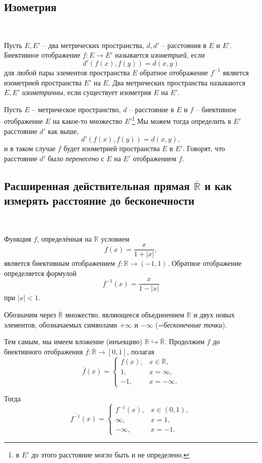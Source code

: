 \subsection{Изометрия}~

Пусть $E,E'$ -- два метрических пространства, $d,d'$ -- расстояния в $E$ и $E'$. Биективное отображение $f:E \to E'$ называется \textit{изометрией}, если
\[
 d'(f(x), f(y)) = d(x,y)
\]
для любой пары элементов пространства $E$ обратное отображение $f^{-1}$ является изометрией пространства $E'$ на $E$. Два метрических пространства называются $E,E'$ \textit{изометричны}, если существует изометрия $E$ на $E'$.


Пусть $E$ -- метрическое пространство, $d$ -- расстояние в $E$ и $f$ -- биективное отображение $E$ на какое-то множество $E'$\footnote{в $E'$ до этого расстояние могло быть и не определено.} Мы можем тогда определить в $E'$ расстояние $d'$ как выше, \ie
\[
 d'(f(x), f(y)) = d(x,y),
\]
и в таком случае $f$ будет изометрией пространства $E$ в $E'$. Говорят, что расстояние $d'$ было \textit{перенесено} с $E$ на $E'$ отображением $f.$

\subsection{Расширенная действительная прямая $\overline{\mathbb{R}}$ и как измерять расстояние до бесконечности}~

Функция $f$, определённая на $\mathbb{R}$ условием 
\[
f(x) = \frac{x}{1+ |x|},
\]
является биективным отображением $f:\mathbb{R} \to (-1,1)$. Обратное отображение определяется формулой 
\[
 f^{-1}(x) = \frac{x}{1- |x|}
\]
при $|x|<1.$

Обозначим через $\overline{\mathbb{R}}$ множество, являющееся объединением $\mathbb{R}$ и двух новых элементов, обозначаемых символами $+\infty$ и $- \infty$ (=\textit{бесконечные точки}).

Тем самым, мы имеем вложение (инъекцию) $\mathbb{R} \hookrightarrow \overline{\mathbb{R}}$. Продолжим $f$ до биективного отображения $\overline{f}: \overline{\mathbb{R}} \to [0,1]$, полагая
\[
\overline{f}(x) = \begin{cases}
    f(x), & x \in \mathbb{R},\\
    1, & x = \infty,\\
    -1, & x = - \infty.
\end{cases}
\]

Тогда
\[
\overline{f^{-1}}(x) = \begin{cases}
    f^{-1}(x), & x \in (0,1),\\
    \infty, & x = 1,\\
    -\infty, & x = - 1.
\end{cases}
\]

